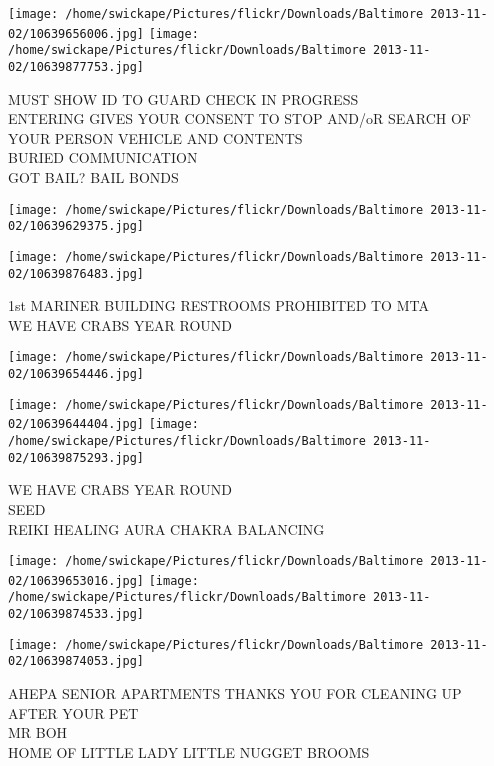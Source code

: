 \documentclass[10pt,letterpaper]{article}
\begin{document}
\texttt{[image: /home/swickape/Pictures/flickr/Downloads/Baltimore 2013-11-02/10639656006.jpg]}
\texttt{[image: /home/swickape/Pictures/flickr/Downloads/Baltimore 2013-11-02/10639877753.jpg]}

MUST SHOW ID TO GUARD CHECK IN PROGRESS\\
ENTERING GIVES YOUR CONSENT TO STOP AND/oR SEARCH OF YOUR PERSON VEHICLE AND CONTENTS\\
BURIED COMMUNICATION\\
GOT BAIL?  BAIL BONDS\\
\pagebreak

\texttt{[image: /home/swickape/Pictures/flickr/Downloads/Baltimore 2013-11-02/10639629375.jpg]}

\vspace{0.25in}
\texttt{[image: /home/swickape/Pictures/flickr/Downloads/Baltimore 2013-11-02/10639876483.jpg]}

1st MARINER BUILDING RESTROOMS PROHIBITED TO MTA\\
WE HAVE CRABS YEAR ROUND\\
\pagebreak

\texttt{[image: /home/swickape/Pictures/flickr/Downloads/Baltimore 2013-11-02/10639654446.jpg]}

\vspace{0.25in}
\texttt{[image: /home/swickape/Pictures/flickr/Downloads/Baltimore 2013-11-02/10639644404.jpg]}
\texttt{[image: /home/swickape/Pictures/flickr/Downloads/Baltimore 2013-11-02/10639875293.jpg]}

WE HAVE CRABS YEAR ROUND\\
SEED\\
REIKI HEALING AURA CHAKRA BALANCING\\
\pagebreak

\texttt{[image: /home/swickape/Pictures/flickr/Downloads/Baltimore 2013-11-02/10639653016.jpg]}
\texttt{[image: /home/swickape/Pictures/flickr/Downloads/Baltimore 2013-11-02/10639874533.jpg]}

\vspace{0.25in}
\texttt{[image: /home/swickape/Pictures/flickr/Downloads/Baltimore 2013-11-02/10639874053.jpg]}

AHEPA SENIOR APARTMENTS THANKS YOU FOR CLEANING UP AFTER YOUR PET\\
MR BOH\\
HOME OF LITTLE LADY LITTLE NUGGET BROOMS\\
\pagebreak
\end{document}
